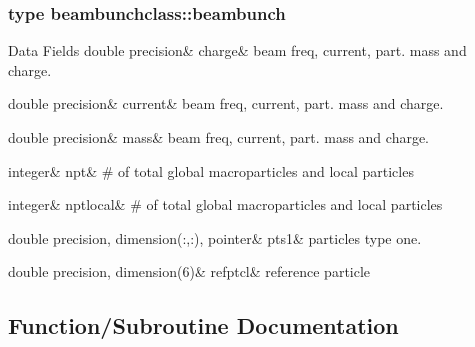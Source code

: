 \subsubsection{type beambunchclass\+::beambunch}
\begin{DoxyFields}{Data Fields}
\mbox{\label{namespacebeambunchclass_a555bb0dc53871a3f69755125598c8938}} 
double precision&
charge&
beam freq, current, part. mass and charge. \\
\hline

\mbox{\label{namespacebeambunchclass_a0611d8fb67f60eb1ea7a3df79c5de915}} 
double precision&
current&
beam freq, current, part. mass and charge. \\
\hline

\mbox{\label{namespacebeambunchclass_abeaad3b1ce823a9c49cab5a8b96f5ff0}} 
double precision&
mass&
beam freq, current, part. mass and charge. \\
\hline

\mbox{\label{namespacebeambunchclass_a20f5303645e1b7fa0cbfa88f81cda947}} 
integer&
npt&
\# of total global macroparticles and local particles \\
\hline

\mbox{\label{namespacebeambunchclass_a71a8687235fdc19d862fb13092b714a3}} 
integer&
nptlocal&
\# of total global macroparticles and local particles \\
\hline

\mbox{\label{namespacebeambunchclass_af0d19c1e3e537ade010af8554783c8d7}} 
double precision, dimension(:,:), pointer&
pts1&
particles type one. \\
\hline

\mbox{\label{namespacebeambunchclass_a973e0e4ee1b24185bac1d727d2c074f5}} 
double precision, dimension(6)&
refptcl&
reference particle \\
\hline

\end{DoxyFields}


\subsection{Function/\+Subroutine Documentation}
\mbox{\label{namespacebeambunchclass_a91563d467d36ccca8231ee2c62483246}} 
